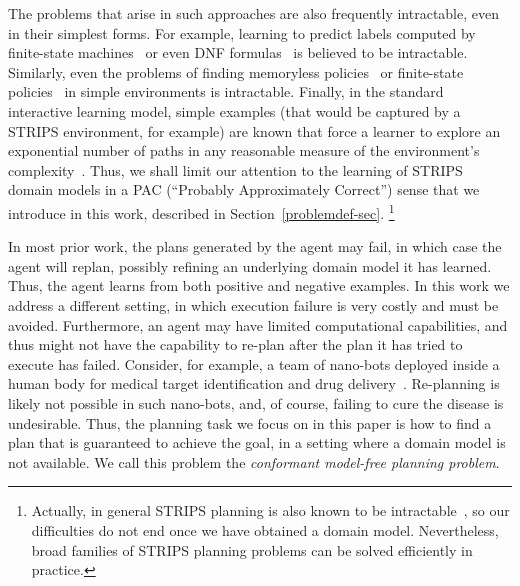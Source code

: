 \documentclass{article}
\begin{document}
	The problems that arise in such approaches are also frequently intractable, even in their simplest forms.
	For example, learning to predict labels computed by finite-state machines~\cite{kearns1994} or even DNF formulas~\cite{daniely2016} is believed to be intractable. 
	Similarly, even the problems of finding memoryless policies~\cite{littman1994} or finite-state policies~\cite{meuleau1999} in simple environments is intractable.
	Finally, in the standard interactive learning model, simple examples (that would be captured by a STRIPS environment, for example) are known that force a learner to explore an exponential number of paths in any reasonable measure of the environment's complexity~\cite[Section 8.6]{kakade2003}.
	Thus, we shall limit our attention to the learning of STRIPS domain models in a PAC (``Probably Approximately Correct'') sense that we introduce in this work, described in Section~\ref{problemdef-sec}.%
	\footnote{Actually, in general STRIPS planning is also known to be intractable~\cite{bylander1994,erol1995}, so our difficulties do not end once we have obtained a domain model. Nevertheless, broad families of STRIPS planning problems can be solved efficiently in practice.}
	
	
	In most prior work, the plans generated by the agent may fail, in which case the agent will replan, possibly refining an underlying domain model it has learned. Thus, the agent learns from both positive and negative examples. In this work we address a different setting, in which execution failure is very costly and must be avoided. Furthermore, an agent may have limited computational capabilities, and thus might not have the capability to re-plan after the plan it has tried to execute has failed. 
	Consider, for example, a team of nano-bots deployed inside a human body for medical target identification and drug delivery~\cite{cavalcanti2007nanorobot}. Re-planning is likely not possible in such nano-bots, and, of course, failing to cure the disease is undesirable. Thus, the planning task we focus on in this paper is how to find a plan that is guaranteed to achieve the goal, in a setting where a domain model is not available. We call this problem the {\em conformant model-free planning problem}. 
	
\end{document}
